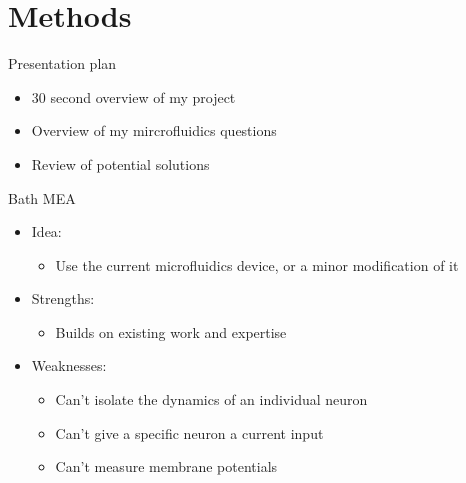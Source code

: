 \documentclass[aspectratio=169]{beamer}
\begin{document}
\section{Methods}
\label{sec:org52f1efc}
\begin{frame}[label={sec:org0c27409}]{Presentation plan}
\begin{itemize}
\item 30 second overview of my project
\item Overview of my mircrofluidics questions
\item \alert{Review of potential solutions}
\end{itemize}
\end{frame}
\begin{frame}[label={sec:orga50b009}]{Bath MEA}
\begin{itemize}
\item Idea:
\begin{itemize}
\item Use the current microfluidics device, or a minor modification of it
\end{itemize}
\item Strengths:
\begin{itemize}
\item Builds on existing work and expertise
\end{itemize}
\item Weaknesses:
\begin{itemize}
\item Can't isolate the dynamics of an individual neuron
\item Can't give a specific neuron a current input
\item Can't measure membrane potentials
\end{itemize}
\end{itemize}
\end{frame}
\end{document}
